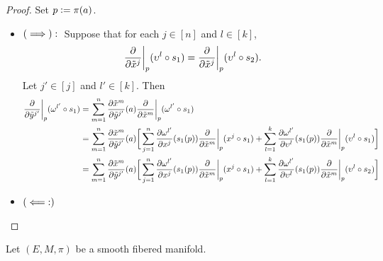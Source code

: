 \documentclass{book}
\begin{document}
\begin{proof}
	Set $p \vcentcolon= \pi(a)$.
	\begin{itemize}
		\item $(\implies): \\$
		Suppose that for each $j \in [n]$ and $l \in [k]$, 
		$$\frac{\partial}{\partial \tilde{x}^j} \bigg|_{p} ( \upsilon^l \circ s_1 ) = \frac{\partial}{\partial \tilde{x}^j} \bigg|_{p} ( \upsilon^l \circ s_2 ).$$
		Let $j' \in [j]$ and $l' \in [k]$. Then 
		\begin{align*}
			\frac{\partial}{\partial \tilde{y}^{j'}} \bigg|_{p} ( \omega^{l'} \circ s_1 )
			& = \sum_{m = 1}^n \frac{\partial \tilde{x}^m}{\partial \tilde{y}^{j'}}(a) \frac{\partial}{\partial \tilde{x}^m} \bigg|_{p} ( \omega^{l'} \circ s_1 ) \\
			& = \sum_{m = 1}^n \frac{\partial \tilde{x}^m}{\partial \tilde{y}^{j'}}(a) \bigg[ \sum_{j = 1}^n \frac{\partial \omega^{l'}}{\partial x^j}(s_1(p)) \frac{\partial }{\partial \tilde{x}^m} \bigg|_p ( x^j \circ s_1) + \sum_{l = 1}^k \frac{\partial \omega^{l'}}{\partial \upsilon^l}(s_1(p))  \frac{\partial }{\partial \tilde{x}^m} \bigg|_p ( \upsilon^l \circ s_1) \bigg]  \\
			& = \sum_{m = 1}^n \frac{\partial \tilde{x}^m}{\partial \tilde{y}^{j'}}(a) \bigg[ \sum_{j = 1}^n \frac{\partial \omega^{l'}}{\partial x^j}(s_1(p)) \frac{\partial }{\partial \tilde{x}^m} \bigg|_p ( x^j \circ s_1) + \sum_{l = 1}^k \frac{\partial \omega^{l'}}{\partial \upsilon^l}(s_1(p))  \frac{\partial }{\partial \tilde{x}^m} \bigg|_p ( \upsilon^l \circ s_2) \bigg]  \\
		\end{align*}
		\item $(\impliedby:) \\$
	\end{itemize}
\end{proof}




\begin{defn}
	Let $(E, M, \pi)$ be a smooth fibered manifold. 
\end{defn}

\begin{ex}
	
\end{ex}
\end{document}
